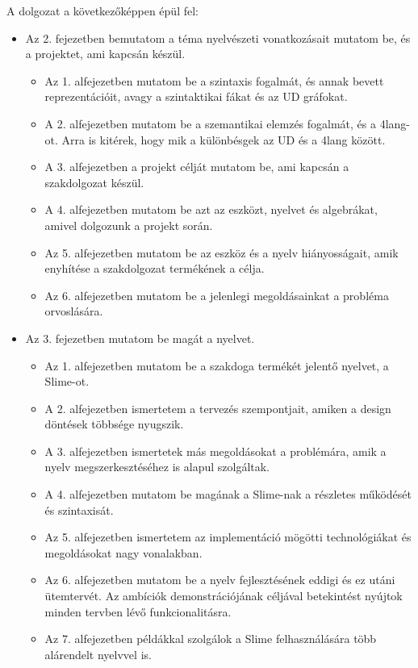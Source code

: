 A dolgozat a következőképpen épül fel: 
\begin{itemize}
\item Az 2. fejezetben bemutatom a téma nyelvészeti vonatkozásait mutatom be, és a projektet, ami kapcsán készül.

\begin{itemize}
\item Az 1. alfejezetben mutatom be a szintaxis fogalmát, és annak bevett reprezentációit, avagy a szintaktikai fákat és az UD gráfokat.
\item A 2. alfejezetben mutatom be a szemantikai elemzés fogalmát, és a 4lang-ot.
Arra is kitérek, hogy mik a különbésgek az UD és a 4lang között.
\item A 3. alfejezetben a projekt célját mutatom be, ami kapcsán a szakdolgozat készül. 
\item A 4. alfejezetben mutatom be azt az eszközt, nyelvet és algebrákat, amivel dolgozunk a projekt során.
\item Az 5. alfejezetben mutatom be az eszköz és a nyelv hiányosságait, amik enyhítése a szakdolgozat termékének a célja.
\item Az 6. alfejezetben mutatom be a jelenlegi megoldásainkat a probléma orvoslására.
\end{itemize} 

\item Az 3. fejezetben mutatom be magát a nyelvet.

\begin{itemize}
\item Az 1. alfejezetben mutatom be a szakdoga termékét jelentő nyelvet, a Slime-ot.
\item A 2. alfejezetben ismertetem a tervezés szempontjait, amiken a design döntések többsége nyugszik.
\item A 3. alfejezetben ismertetek más megoldásokat a problémára, amik a nyelv megszerkesztéséhez is alapul szolgáltak.
\item A 4. alfejezetben mutatom be magának a Slime-nak a részletes működését és szintaxisát.
\item Az 5. alfejezetben ismertetem az implementáció mögötti technológiákat és megoldásokat nagy vonalakban.
\item Az 6. alfejezetben mutatom be a nyelv fejlesztésének eddigi és ez utáni ütemtervét.
Az ambíciók demonstrációjának céljával betekintést nyújtok minden tervben lévő funkcionalitásra.
\item Az 7. alfejezetben példákkal szolgálok a Slime felhasználására több alárendelt nyelvvel is.
\end{itemize}

\end{itemize} 
